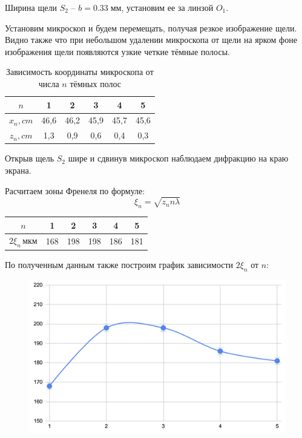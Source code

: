 \documentclass[a4paper,12pt]{article} %
\begin{document}
Ширина щели \(S_2\) -- \(b = 0.33\;мм\), установим ее за линзой \(O_1\).

Установим микроскоп и будем перемещать, получая резкое изображение щели. Видно также что при небольшом удалении микроскопа от щели на ярком фоне изображения щели появляются узкие четкие тёмные полосы.


\begin{table}[H]
  \caption{Зависимость координаты микроскопа от числа $ n $ тёмных полос}
  \label{table1}  
  \begin{center}
    \begin{tabular}{|c|c|c|c|c|c|}
\hline
   \(n\)        &   1  &   2  &   3  &   4  &   5    \\\hline
   \(x_n, cm\)  & 46,6 & 46,2 & 45,9 & 45,7 & 45,6 \\\hline
   \(z_n, cm\)  & 1,3  & 0,9  & 0,6  & 0,4  & 0,3 \\\hline
    \end{tabular}
  \end{center}
\end{table}

Открыв щель \(S_2\) шире и сдвинув микроскоп наблюдаем дифракцию на краю экрана.

Расчитаем зоны Френеля по формуле:
\[ \xi_n = \sqrt{z_nn\lambda} \]

\begin{table}[H]
  \centering
  \begin{tabular}{|c|c|c|c|c|c|}
    \hline
   \(n\)              &  1  & 2   &  3  &  4  &  5    \\\hline
   \(2\xi_n\, мкм\)  & 168 & 198 & 198 & 186 & 181   \\\hline
  \end{tabular}
\end{table}

По полученным данным также построим график зависимости $ 2\xi_n $ от $ n $:

\begin{figure}[H]
  \centering
  \includegraphics[width=\textwidth]{frnl.png}
\end{figure}
\end{document}
